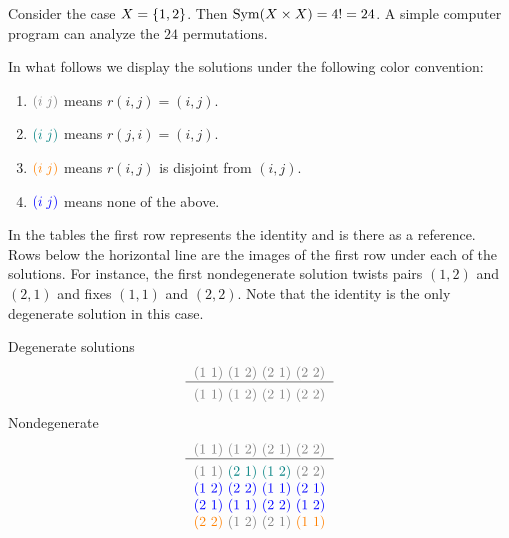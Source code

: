 \begin{xmpl}
    Consider the case $X=\{1,2\}$. Then ${\rm Sym}(X\times X)=4!=24$. A simple computer program can analyze the $24$ permutations.

    In what follows we display the solutions under the following color convention:
    \begin{enumerate}[-]
        \item $\textcolor{gray}{(i\; j)}$ means $r(i,j)=(i,j)$.
        \item $\textcolor{teal}{(i\; j)}$ means $r(j,i)=(i,j)$.
        \item $\textcolor{orange}{(i\; j)}$ means $r(i,j)$ is disjoint from $(i,j)$.
        \item $\textcolor{blue}{(i\; j)}$ means none of the above.
    \end{enumerate}

    In the tables the first row represents the identity and is there as a reference. Rows below the horizontal line are the images of the first row under each of the solutions. For instance, the first nondegenerate solution twists pairs $(1,2)$ and $(2,1)$ and fixes $(1,1)$ and $(2,2)$. Note that the identity is the only degenerate solution in this case.
    
    Degenerate solutions
    $$
    	\begin{tabular}{c}
    		\textcolor{gray}{(1 1) (1 2) (2 1) (2 2)}\\
    		\hline\\[-3mm]
    		\textcolor{gray}{(1 1)} \textcolor{gray}{(1 2)}
                \textcolor{gray}{(2 1)} \textcolor{gray}{(2 2)}
    	\end{tabular}
    $$
    Nondegenerate
    $$
    	\begin{tabular}{c}
    		\textcolor{gray}{(1 1) (1 2) (2 1) (2 2)}\\
    		\hline\\[-3mm]
    		\textcolor{gray}{(1 1)} \textcolor{teal}{(2 1)} \textcolor{teal}{(1 2)} \textcolor{gray}{(2 2)}\\
    		\textcolor{blue}{(1 2)} \textcolor{blue}{(2 2)} \textcolor{blue}{(1 1)} \textcolor{blue}{(2 1)}\\
    		\textcolor{blue}{(2 1)} \textcolor{blue}{(1 1)} \textcolor{blue}{(2 2)} \textcolor{blue}{(1 2)}\\
    		\textcolor{orange}{(2 2)} \textcolor{gray}{(1 2)} \textcolor{gray}{(2 1)} \textcolor{orange}{(1 1)}
    	\end{tabular}
    $$
\end{xmpl}

